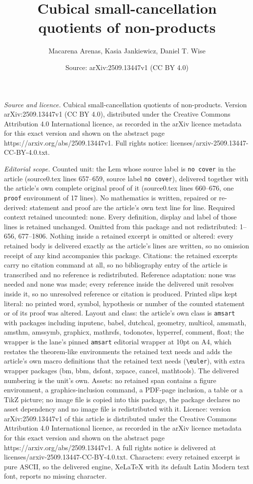 \documentclass[10pt,a4paper]{amsart}
\title[Cubical small-cancellation quotients of non-products]{Cubical small-cancellation quotients of non-products}
\author{Macarena Arenas, Kasia Jankiewicz, Daniel T. Wise}
\date{Source: arXiv:2509.13447v1 (CC BY 4.0)}
\begin{document}
\maketitle

\noindent\emph{Source and licence.} Cubical small-cancellation quotients of non-products. Version arXiv:2509.13447v1 (CC BY 4.0), distributed under the Creative Commons Attribution 4.0 International licence, as recorded in the arXiv licence metadata for this exact version and shown on the abstract page https://arxiv.org/abs/2509.13447v1. Full rights notice: licenses/arxiv-2509.13447-CC-BY-4.0.txt.\par\smallskip

\noindent\textit{Editorial scope.} Counted unit: the Lem whose source label is \texttt{no cover} in the article (source0.tex lines 657--659, source label \texttt{no cover}), delivered together with the article's own complete original proof of it (source0.tex lines 660--676, one \texttt{proof} environment of 17 lines). No mathematics is written, repaired or re-derived: statement and proof are the article's own text line for line. Required context retained uncounted: none. Every definition, display and label of those lines is retained unchanged. Omitted from this package and not redistributed: 1--656, 677--1806. Nothing inside a retained excerpt is omitted or altered: every retained body is delivered exactly as the article's lines are written, so no omission receipt of any kind accompanies this package. Citations: the retained excerpts carry no citation command at all, so no bibliography entry of the article is transcribed and no reference is redistributed. Reference adaptation: none was needed and none was made; every reference inside the delivered unit resolves inside it, so no unresolved reference or citation is produced. Printed slips kept literal: no printed word, symbol, hypothesis or number of the counted statement or of its proof was altered. Layout and class: the article's own class is \texttt{amsart} with packages including inputenc, babel, dutchcal, geometry, multicol, amsmath, amsthm, amssymb, graphicx, mathrsfs, todonotes, hyperref, comment, float; the wrapper is the lane's pinned \texttt{amsart} editorial wrapper at 10pt on A4, which restates the theorem-like environments the retained text needs and adds the article's own macro definitions that the retained text needs (\texttt{\textbackslash euler}), with extra wrapper packages (bm, bbm, dsfont, xspace, cancel, mathtools). The delivered numbering is the unit's own. Assets: no retained span contains a figure environment, a graphics-inclusion command, a PDF-page inclusion, a table or a TikZ picture; no image file is copied into this package, the package declares no asset dependency and no image file is redistributed with it. Licence: version arXiv:2509.13447v1 of this article is distributed under the Creative Commons Attribution 4.0 International licence, as recorded in the arXiv licence metadata for this exact version and shown on the abstract page https://arxiv.org/abs/2509.13447v1. A full rights notice is delivered at licenses/arxiv-2509.13447-CC-BY-4.0.txt. Characters: every retained excerpt is pure ASCII, so the delivered engine, XeLaTeX with its default Latin Modern text font, reports no missing character.
\end{document}
